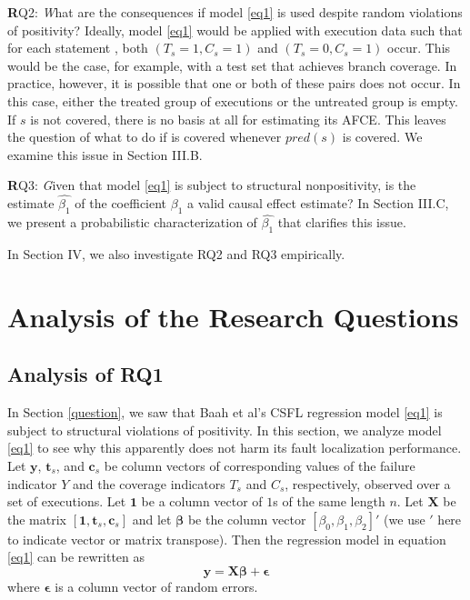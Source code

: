 {\textbf RQ2}: {\textit What are the consequences if model \eqref{eq1} is used despite random violations of positivity?}  Ideally, model \eqref{eq1} would be applied with execution data such that for each statement , both $(T_s=1,C_s=1)$ and $(T_s=0,C_s=1)$ occur.  This would be the case, for example, with a test set that achieves branch coverage.  In practice, however, it is possible that one or both of these pairs does not occur.  In this case, either the treated group of executions or the untreated group is empty.  If $s$ is not covered, there is no basis at all for estimating its AFCE.  This leaves the question of what to do if  is covered whenever $pred(s)$ is covered.  We examine this issue in Section III.B.

{\textbf RQ3}: {\textit Given that model \eqref{eq1} is subject to structural nonpositivity, is the estimate $\hat{\beta_1}$ of the coefficient $\beta_1$ a valid causal effect estimate?}  In Section III.C, we present a probabilistic characterization of $\hat{\beta_1}$ that clarifies this issue. 

In Section IV, we also investigate RQ2 and RQ3 empirically.

\section{Analysis of the Research Questions}\label{sec3}
\subsection{Analysis of RQ1}\label{sec3.1}

In Section \ref{question}, we saw that Baah et al’s CSFL regression model \eqref{eq1} is subject to structural violations of positivity.  In this section, we analyze model \eqref{eq1} to see why this apparently does not harm its fault localization performance.  Let $\mathbf{y}$, $\mathbf{t}_s$, and $\mathbf{c}_s$ be column vectors of corresponding values of the failure indicator $Y$ and the coverage indicators $T_s$ and $C_s$, respectively, observed over a set of executions.  Let $\mathbf{1}$ be a column vector of $1$s of the same length $n$.  Let $\mathbf{X}$ be the matrix $[\mathbf{1}, \mathbf{t}_s, \mathbf{c}_s]$ and let $\mathbf{\beta}$ be the column vector $[\beta_0, \beta_1, \beta_2]'$ (we use $'$ here to indicate vector or matrix transpose). Then the regression model in equation \eqref{eq1} can be rewritten as
\begin{equation}\label{eq2}
\mathbf{y}=\mathbf{X} \bm{\beta}+\bm{\epsilon}
\end{equation}
where $\bm{\epsilon}$ is a column vector of random errors.

